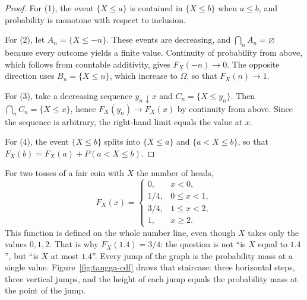 \begin{proof}
For (1), the event $\{X\le a\}$ is contained in $\{X\le b\}$ when $a\le b$, and
probability is monotone with respect to inclusion.

For (2), let $A_n=\{X\le -n\}$. These events are decreasing, and
$\bigcap_n A_n=\varnothing$ because every outcome yields a finite value. Continuity of
probability from above, which follows from countable additivity, gives $F_X(-n)\to0$. The
opposite direction uses $B_n=\{X\le n\}$, which increase to $\Omega$, so that
$F_X(n)\to1$.

For (3), take a decreasing sequence $y_n\downarrow x$ and $C_n=\{X\le y_n\}$. Then
$\bigcap_n C_n=\{X\le x\}$, hence $F_X(y_n)\to F_X(x)$ by continuity from above.
Since the sequence is arbitrary, the right-hand limit equals the value at $x$.

For (4), the event $\{X\le b\}$ splits into $\{X\le a\}$ and $\{a<X\le b\}$,
so that $F_X(b)=F_X(a)+P(a<X\le b)$.
\end{proof}

For two tosses of a fair coin with $X$ the number of heads,
\[
F_X(x)=\begin{cases}
0, & x<0,\\
1/4, & 0\le x<1,\\
3/4, & 1\le x<2,\\
1, & x\ge 2.
\end{cases}
\]
This function is defined on the whole number line, even though $X$ takes only the values $0,1,2$.
That is why $F_X(1.4)=3/4$: the question is not ``is $X$ equal to $1.4$'',
but ``is $X$ at most $1.4$''. Every jump of the graph is the probability
mass at a single value. Figure~\ref{fig:tangga-cdf} draws that staircase: three horizontal
steps, three vertical jumps, and the height of each jump equals the probability
mass at the point of the jump.

